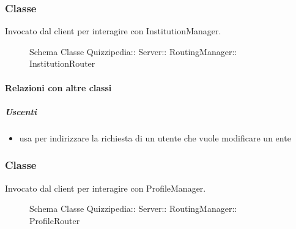 \subsubsection{Classe }
Invocato dal client per interagire con InstitutionManager.
\begin{figure}[H]
\centering
\noindent{}
\caption[Schema Classe InstitutionRouter]{Schema Classe Quizzipedia:: Server:: RoutingManager:: InstitutionRouter}
\end{figure}
\paragraph{Relazioni con altre classi}
\subparagraph{Uscenti}
\begin{itemize}
\item usa  per indirizzare la richiesta di un utente che vuole modificare un ente
\end{itemize}
\subsubsection{Classe }
Invocato dal client per interagire con ProfileManager.
\begin{figure}[H]
\centering
\noindent{}
\caption[Schema Classe ProfileRouter]{Schema Classe Quizzipedia:: Server:: RoutingManager:: ProfileRouter}
\end{figure}
